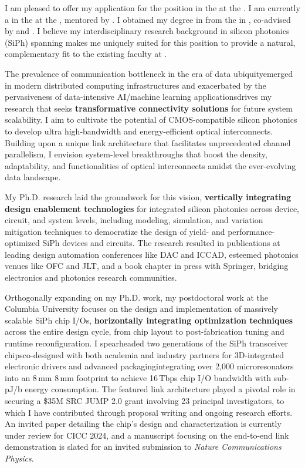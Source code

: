 I am pleased to offer my application for the \appPosition{} position \appJobID{} in the \appDept{} at the \appSchool{}. I am currently a \myTitle{} in the \myDept{} at the \mySchoolShort{}, mentored by \mySuper{}. I obtained my \myDegree{} degree in \myMajor{} from the \myPhDSchool{} in \myPhDYear{}, co-advised by \myAdvisor{} and \myCoAdvisor{}. I believe my interdisciplinary research background in silicon photonics (SiPh) spanning \appArea{} makes me uniquely suited for this position to provide a natural, complementary fit to the existing faculty at \appSchoolDeptShort{}.

The prevalence of communication bottleneck in the era of data ubiquity\textemdash emerged in modern distributed computing infrastructures and exacerbated by the pervasiveness of data-intensive AI/machine learning applications\textemdash drives my research that seeks \textbf{transformative connectivity solutions} for future system scalability. I aim to cultivate the potential of CMOS-compatible silicon photonics to develop ultra high-bandwidth and energy-efficient optical interconnects. Building upon a unique link architecture that facilitates unprecedented channel parallelism, I envision system-level breakthroughs that boost the density, adaptability, and functionalities of optical interconnects amidst the ever-evolving data landscape.

My Ph.D. research laid the groundwork for this vision, \textbf{vertically integrating design enablement technologies} for integrated silicon photonics across device, circuit, and system levels, including modeling, simulation, and variation mitigation techniques to democratize the design of yield- and performance-optimized SiPh devices and circuits. The research resulted in publications at leading design automation conferences like DAC and ICCAD, esteemed photonics venues like OFC and JLT, and a book chapter in press with Springer, bridging electronics and photonics research communities.

Orthogonally expanding on my Ph.D. work, my postdoctoral work at the Columbia University focuses on the design and implementation of massively scalable SiPh chip I/Os, \textbf{horizontally integrating optimization techniques} across the entire design cycle, from chip layout to post-fabrication tuning and runtime reconfiguration. I spearheaded two generations of the SiPh transceiver chips\textemdash co-designed with both academia and industry partners for 3D-integrated electronic drivers and advanced packaging\textemdash integrating over 2,000 microresonators into an 8\,mm \texttimes{} 8\,mm footprint to achieve 16\,Tbps chip I/O bandwidth with sub-pJ/b energy consumption. The featured link architecture played a pivotal role in securing a \$35M SRC JUMP 2.0 grant involving 23 principal investigators, to which I have contributed through proposal writing and ongoing research efforts. An invited paper detailing the chip's design and characterization is currently under review for CICC 2024, and a manuscript focusing on the end-to-end link demonstration is slated for an invited submission to \emph{Nature Communications Physics}.

